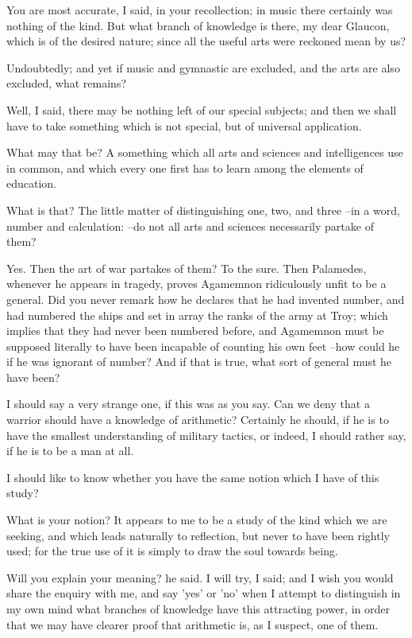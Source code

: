 You are most accurate, I said, in your recollection; in music there certainly was nothing of the kind. But what branch of knowledge is there, my dear Glaucon, which is of the desired nature; since all the useful arts were reckoned mean by us?

Undoubtedly; and yet if music and gymnastic are excluded, and the arts are also excluded, what remains?

Well, I said, there may be nothing left of our special subjects; and then we shall have to take something which is not special, but of universal application.

What may that be?
A something which all arts and sciences and intelligences use in common, and which every one first has to learn among the elements of education.

What is that?
The little matter of distinguishing one, two, and three --in a word, number and calculation: --do not all arts and sciences necessarily partake of them?

Yes.
Then the art of war partakes of them?
To the sure.
Then Palamedes, whenever he appears in tragedy, proves Agamemnon ridiculously unfit to be a general. Did you never remark how he declares that he had invented number, and had numbered the ships and set in array the ranks of the army at Troy; which implies that they had never been numbered before, and Agamemnon must be supposed literally to have been incapable of counting his own feet --how could he if he was ignorant of number? And if that is true, what sort of general must he have been?

I should say a very strange one, if this was as you say.
Can we deny that a warrior should have a knowledge of arithmetic?
Certainly he should, if he is to have the smallest understanding of military tactics, or indeed, I should rather say, if he is to be a man at all.

I should like to know whether you have the same notion which I have of this study?

What is your notion?
It appears to me to be a study of the kind which we are seeking, and which leads naturally to reflection, but never to have been rightly used; for the true use of it is simply to draw the soul towards being.

Will you explain your meaning? he said.
I will try, I said; and I wish you would share the enquiry with me, and say 'yes' or 'no' when I attempt to distinguish in my own mind what branches of knowledge have this attracting power, in order that we may have clearer proof that arithmetic is, as I suspect, one of them.

